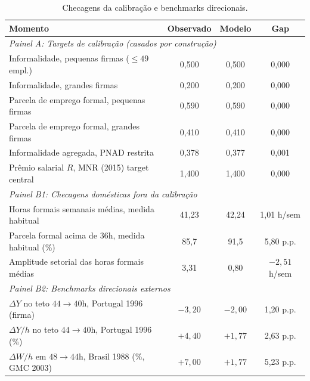 \documentclass[10pt,twocolumn]{article}
\begin{document}
\begin{table}[t]
\centering
\caption{Checagens da calibra\c{c}\~ao e benchmarks direcionais.}\label{tab:calibration_fit}
\small
\begin{tabular}{lccc}
\hline\hline
Momento & Observado & Modelo & Gap \\
\hline
\multicolumn{4}{l}{\textit{Painel A: Targets de calibra\c{c}\~ao (casados por constru\c{c}\~ao)}} \\
\hline
Informalidade, pequenas firmas ($\leq 49$ empl.)  & 0{,}500 & 0{,}500 & 0{,}000 \\
Informalidade, grandes firmas                     & 0{,}200 & 0{,}200 & 0{,}000 \\
Parcela de emprego formal, pequenas firmas        & 0{,}590 & 0{,}590 & 0{,}000 \\
Parcela de emprego formal, grandes firmas         & 0{,}410 & 0{,}410 & 0{,}000 \\
Informalidade agregada, PNAD restrita             & 0{,}378 & 0{,}377 & 0{,}001 \\
Pr\^emio salarial $R$, MNR (2015) target central  & 1{,}400 & 1{,}400 & 0{,}000 \\
\hline
\multicolumn{4}{l}{\textit{Painel B1: Checagens dom\'esticas fora da calibra\c{c}\~ao}} \\
\hline
Horas formais semanais m\'edias, medida habitual           & 41{,}23 & 42{,}24 & 1{,}01 h/sem \\
Parcela formal acima de $36$h, medida habitual (\%)        & 85{,}7  & 91{,}5  & 5{,}80 p.p. \\
Amplitude setorial das horas formais m\'edias              & 3{,}31  & 0{,}80  & $-2{,}51$ h/sem \\
\hline
\multicolumn{4}{l}{\textit{Painel B2: Benchmarks direcionais externos}} \\
\hline
$\Delta Y$ no teto $44\to 40$h, Portugal 1996 (firma)     & $-3{,}20$ & $-2{,}00$ & 1{,}20 p.p. \\
$\Delta Y/h$ no teto $44\to 40$h, Portugal 1996 (\%)      & $+4{,}40$ & $+1{,}77$ & 2{,}63 p.p. \\
$\Delta W/h$ em $48\to 44$h, Brasil 1988 (\%, GMC 2003)   & $+7{,}00$ & $+1{,}77$ & 5{,}23 p.p. \\
\hline\hline
\end{tabular}
\\[2pt]
\begin{minipage}{0.95\textwidth}
\justifying

\end{minipage}
\end{table}
\end{document}

